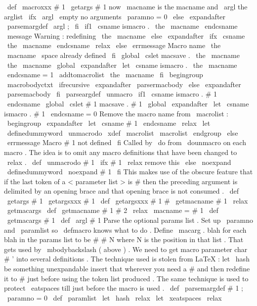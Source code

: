 {{}
\
def
\
macroxxx
#
1
{
%
\
getargs
{
#
1
}
%
now
\
macname
is
the
macname
and
\
argl
the
arglist
\
ifx
\
argl
\
empty
%
no
arguments
\
paramno
=
0
%
\
else
\
expandafter
\
parsemargdef
\
argl
;
%
\
fi
\
if1
\
csname
ismacro
.
\
the
\
macname
\
endcsname
\
message
{
Warning
:
redefining
\
the
\
macname
}
%
\
else
\
expandafter
\
ifx
\
csname
\
the
\
macname
\
endcsname
\
relax
\
else
\
errmessage
{
Macro
name
\
the
\
macname
\
space
already
defined
}
\
fi
\
global
\
cslet
{
macsave
.
\
the
\
macname
}
{
\
the
\
macname
}
%
\
global
\
expandafter
\
let
\
csname
ismacro
.
\
the
\
macname
\
endcsname
=
1
%
\
addtomacrolist
{
\
the
\
macname
}
%
\
fi
\
begingroup
\
macrobodyctxt
\
ifrecursive
\
expandafter
\
parsermacbody
\
else
\
expandafter
\
parsemacbody
\
fi
}
\
parseargdef
\
unmacro
{
%
\
if1
\
csname
ismacro
.
#
1
\
endcsname
\
global
\
cslet
{
#
1
}
{
macsave
.
#
1
}
%
\
global
\
expandafter
\
let
\
csname
ismacro
.
#
1
\
endcsname
=
0
%
%
Remove
the
macro
name
from
\
macrolist
:
\
begingroup
\
expandafter
\
let
\
csname
#
1
\
endcsname
\
relax
\
let
\
definedummyword
\
unmacrodo
\
xdef
\
macrolist
{
\
macrolist
}
%
\
endgroup
\
else
\
errmessage
{
Macro
#
1
not
defined
}
%
\
fi
}
%
Called
by
\
do
from
\
dounmacro
on
each
macro
.
The
idea
is
to
omit
any
%
macro
definitions
that
have
been
changed
to
\
relax
.
%
\
def
\
unmacrodo
#
1
{
%
\
ifx
#
1
\
relax
%
remove
this
\
else
\
noexpand
\
definedummyword
\
noexpand
#
1
%
\
fi
}
%
This
makes
use
of
the
obscure
feature
that
if
the
last
token
of
a
%
<
parameter
list
>
is
#
then
the
preceding
argument
is
delimited
by
%
an
opening
brace
and
that
opening
brace
is
not
consumed
.
\
def
\
getargs
#
1
{
\
getargsxxx
#
1
{
}
}
\
def
\
getargsxxx
#
1
#
{
\
getmacname
#
1
\
relax
\
getmacargs
}
\
def
\
getmacname
#
1
#
2
\
relax
{
\
macname
=
{
#
1
}
}
\
def
\
getmacargs
#
1
{
\
def
\
argl
{
#
1
}
}
%
Parse
the
optional
{
params
}
list
.
Set
up
\
paramno
and
\
paramlist
%
so
\
defmacro
knows
what
to
do
.
Define
\
macarg
.
blah
for
each
blah
%
in
the
params
list
to
be
#
#
N
where
N
is
the
position
in
that
list
.
%
That
gets
used
by
\
mbodybackslash
(
above
)
.
%
We
need
to
get
macro
parameter
char
#
'
into
several
definitions
.
%
The
technique
used
is
stolen
from
LaTeX
:
let
\
hash
be
something
%
unexpandable
insert
that
wherever
you
need
a
#
and
then
redefine
%
it
to
#
just
before
using
the
token
list
produced
.
%
%
The
same
technique
is
used
to
protect
\
eatspaces
till
just
before
%
the
macro
is
used
.
\
def
\
parsemargdef
#
1
;
{
\
paramno
=
0
\
def
\
paramlist
{
}
%
\
let
\
hash
\
relax
\
let
\
xeatspaces
\
relax
}}
